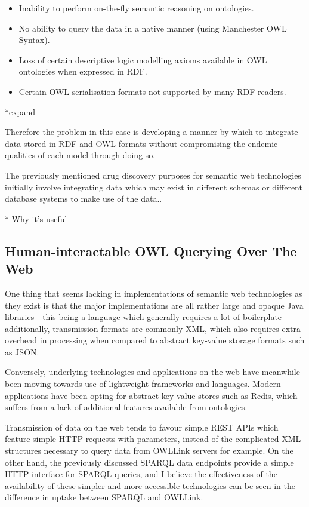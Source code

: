 \documentclass{article}
\begin{document}
\begin{itemize}
  \item Inability to perform on-the-fly semantic reasoning on ontologies.
  \item No ability to query the data in a native manner (using Manchester OWL Syntax).
  \item Loss of certain descriptive logic modelling axioms available in OWL
  ontologies when expressed in RDF.
  \item Certain OWL serialisation formats not supported by many RDF readers.
\end{itemize}

*expand

Therefore the problem in this case is developing a manner by which to integrate
data stored in RDF and OWL formats without compromising the endemic qualities of 
each model through doing so.

The previously mentioned drug discovery purposes for semantic web technologies
initially involve integrating data which may exist in different schemas or
different database systems to make use of the data.\cite{semwebdiscovery}.

* Why it's useful

\subsection{Human-interactable OWL Querying Over The Web}

One thing that seems lacking in implementations of semantic web technologies as
they exist is that the major implementations are all rather large and opaque
Java libraries - this being a language which generally requires a lot of
boilerplate - additionally, transmission formats are commonly XML, which also
requires extra overhead in processing when compared to abstract key-value
storage formats such as JSON. 

Conversely, underlying technologies and applications on the web have meanwhile 
been moving towards use of lightweight frameworks and languages. Modern applications 
have been opting for abstract key-value stores such as Redis, which suffers from
a lack of additional features available from ontologies. 

Transmission of data on the web tends to favour simple REST APIs which feature 
simple HTTP requests with parameters, instead of the complicated XML structures 
necessary to query data from OWLLink servers for example. On the other hand, the
previously discussed SPARQL data endpoints provide a simple HTTP interface for
SPARQL queries, and I believe the effectiveness of the availability of these
simpler and more accessible technologies can be seen in the difference in uptake
between SPARQL and OWLLink.
\end{document}

